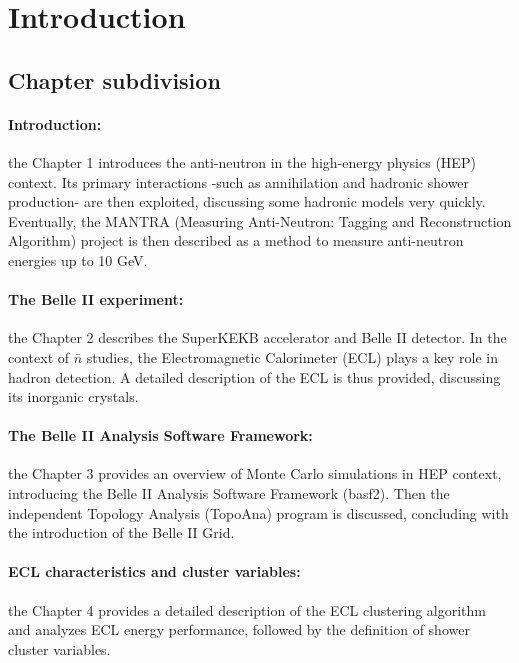\section{Introduction}
\subsection{Chapter subdivision}

\paragraph{Introduction:} the Chapter 1 introduces the anti-neutron in the high-energy physics (HEP) context. Its primary interactions -such as annihilation and hadronic shower production- are then exploited, discussing some hadronic models very quickly. Eventually, the MANTRA (Measuring Anti-Neutron: Tagging and Reconstruction Algorithm) project is then described as a method to measure anti-neutron energies up to 10 GeV.

\paragraph{The Belle II experiment:} the Chapter 2 describes the SuperKEKB accelerator and Belle II detector. In the context of $\bar{n}$ studies, the Electromagnetic Calorimeter (ECL) plays a key role in hadron detection. A detailed description of the ECL is thus provided, discussing its inorganic crystals. 

\paragraph{The Belle II Analysis Software Framework:} the Chapter 3 provides an overview of Monte Carlo simulations in HEP context, introducing the Belle II Analysis Software Framework (basf2). Then the independent Topology Analysis (TopoAna) program is discussed, concluding with the introduction of the Belle II Grid.

\paragraph{ECL characteristics and cluster variables:} the Chapter 4 provides a detailed description of the ECL clustering algorithm and analyzes ECL energy performance, followed by the definition of shower cluster variables.

